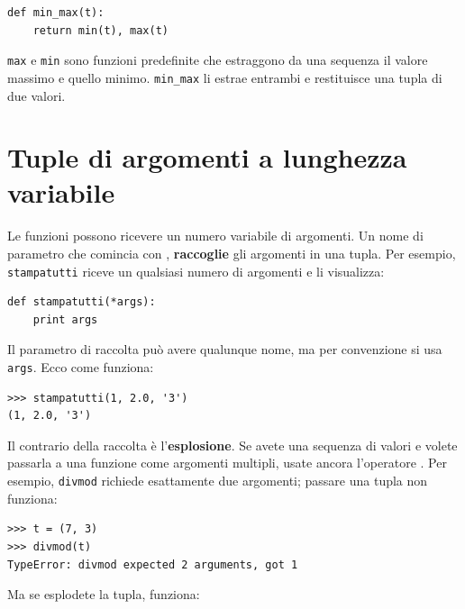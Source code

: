 \documentclass[10pt]{book}
\begin{document}
\begin{verbatim}
def min_max(t):
    return min(t), max(t)
\end{verbatim}
%
{\tt max} e {\tt min} sono funzioni predefinite che estraggono da una sequenza il valore massimo e quello minimo.  \verb"min_max" li estrae entrambi e restituisce una tupla di due valori.


\section{Tuple di argomenti a lunghezza variabile}

Le funzioni possono ricevere un numero variabile di argomenti. Un nome di parametro che comincia con {\tt *}, {\bf raccoglie} gli argomenti in una tupla. Per esempio, {\tt stampatutti} riceve un qualsiasi numero di argomenti e li visualizza:

\begin{verbatim}
def stampatutti(*args):
    print args
\end{verbatim}
%
Il parametro di raccolta può avere qualunque nome, ma per convenzione si usa {\tt args}. Ecco come funziona:

\begin{verbatim}
>>> stampatutti(1, 2.0, '3')
(1, 2.0, '3')
\end{verbatim}
%
Il contrario della raccolta è l'{\bf esplosione}.  Se avete una sequenza di valori e volete passarla a una funzione come argomenti multipli, usate ancora
 l'operatore {\tt *}. Per esempio, {\tt divmod} richiede esattamente due argomenti; passare una tupla non funziona:


%

\begin{verbatim}
>>> t = (7, 3)
>>> divmod(t)
TypeError: divmod expected 2 arguments, got 1
\end{verbatim}
%
Ma se esplodete la tupla, funziona:
\end{document}
